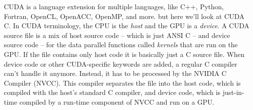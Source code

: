 \documentclass[table, xcdraw]{article}%
\begin{document}
CUDA is a language extension for multiple languages, like  C++, Python, Fortran, OpenCL, OpenACC, OpenMP, and more. but here we'll look at CUDA C. In CUDA terminology, the CPU is the \emph{host} and the GPU is a \emph{device}. A CUDA source file is a mix of host source code -- which is just ANSI C -- and device source code -- for the data parallel functions called \emph{kernels} that are run on the GPU. If the file contains only host code it is basically just a C source file. When device code or other CUDA-specific keywords are added, a regular C compiler can't handle it anymore. Instead, it has to be processed by the NVIDIA C Compiler (NVCC). This compiler separates the file into the host code, which is compiled with the host's standard C compiler, and device code, which is just-in-time compiled by a run-time component of NVCC and run on a GPU.
\end{document}
